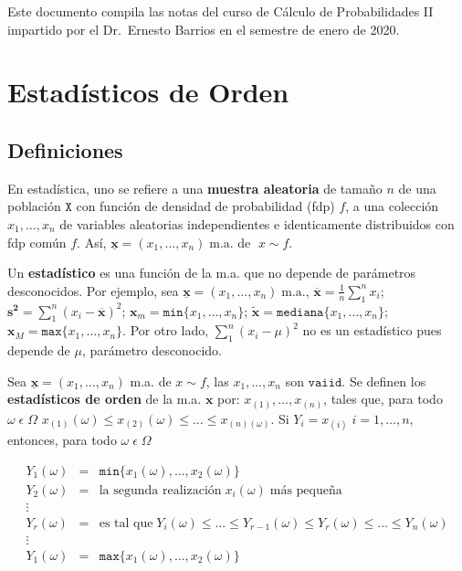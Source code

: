 \documentclass[]{book}
\begin{document}
Este documento compila las notas del curso de Cálculo de Probabilidades II impartido por el Dr.~Ernesto Barrios en el semestre de enero de 2020.

\hypertarget{estord}{%
\chapter{Estadísticos de Orden}\label{estord}}

\hypertarget{definiciones}{%
\section{Definiciones}\label{definiciones}}

En estadística, uno se refiere a una \textbf{muestra aleatoria} de tamaño \(n\) de una población \(\texttt{X}\) con función de densidad de probabilidad (fdp) \(f\), a una colección \(x_1, \ldots, x_n\) de variables aleatorias independientes e identicamente distribuidos con fdp común \(f\). Así, \(\underline{\mathbf{x}} = (x_1, \ldots, x_n) \; \text{m.a. de }\;x \sim f.\)

\vspace{.5cm}

Un \textbf{estadístico} es una función de la m.a. que no depende de parámetros desconocidos. Por ejemplo, sea \(\underline{\mathbf{x}} = (x_1, \ldots, x_n) \; \text{m.a.}\), \(\overline{\mathbf{x}} = \frac{1}{n} \sum_1^n x_i\); \(\mathbf{s^2} = \sum_1^n (x_i - \overline{\mathbf{x}})^2\); \(\mathbf{x}_m = \texttt{min}\{x_1, \ldots, x_n\}\); \(\tilde{\mathbf{x}} = \texttt{mediana}\{x_1, \ldots, x_n\}\); \(\mathbf{x}_M = \texttt{max}\{x_1, \ldots, x_n\}\). Por otro lado, \(\sum_1^n(x_i - \mu)^2\) no es un estadístico pues depende de \(\mu\), parámetro desconocido.

\vspace{.5cm}

Sea \(\underline{\mathbf{x}} = (x_1, \ldots, x_n)\) m.a. de \(x \sim f\), las \(x_1, \ldots, x_n\) son \(\texttt{vaiid}\). Se definen los \textbf{estadísticos de orden} de la m.a. \(\mathbf{x}\) por: \(x_{(1)}, \ldots, x_{(n)}\), tales que, para todo \(\omega \; \epsilon \; \Omega\) \(x_{(1)}(\omega) \leq x_{(2)}(\omega) \leq\ldots \leq x_{(n)(\omega)}\). Si \({Y_i} = x_{(i)} \; i = 1, \ldots, n\), entonces, para todo \(\omega \; \epsilon \; \Omega\)

\[
\begin{array}{ccl}
{Y_1}(\omega) & = & \texttt{min}\{x_1(\omega), \ldots, x_2(\omega)\}\\
{Y_2}(\omega) & = & \text{la segunda realización} \; x_i(\omega) \; \text{más pequeña}\\
\vdots && \\
{Y_r}(\omega) & = & \text{es tal que} \; Y_i(\omega) \leq \ldots \leq Y_{r-1}(\omega) \leq Y_{r}(\omega) \leq \ldots \leq Y_{n}(\omega)  \\
\vdots && \\
{Y_1}(\omega) & = & \texttt{max}\{x_1(\omega), \ldots, x_2(\omega)\}\\
\end{array}
\]
\end{document}
